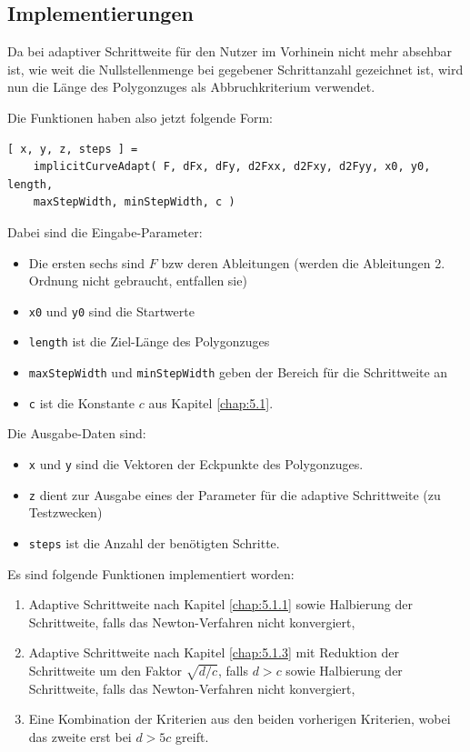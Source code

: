 \documentclass[a4paper,11pt,bibliography=totoc,listof=totoc,headinclude=true,cleardoublepage=empty,oneside]{scrartcl}
\begin{document}
\subsection{Implementierungen}
Da bei adaptiver Schrittweite für den Nutzer im Vorhinein nicht mehr absehbar ist, wie weit die Nullstellenmenge bei gegebener Schrittanzahl gezeichnet ist, wird nun die Länge des Polygonzuges als Abbruchkriterium verwendet.

Die Funktionen haben also jetzt folgende Form:
\begin{verbatim}
[ x, y, z, steps ] = 
    implicitCurveAdapt( F, dFx, dFy, d2Fxx, d2Fxy, d2Fyy, x0, y0, length,
    maxStepWidth, minStepWidth, c )
\end{verbatim}
Dabei sind die Eingabe-Parameter:
\begin{itemize}
	\item Die ersten sechs sind $F$ bzw deren Ableitungen (werden die Ableitungen 2. Ordnung nicht gebraucht, entfallen sie)
	\item \verb|x0| und \verb|y0| sind die Startwerte
	\item \verb|length| ist die Ziel-Länge des Polygonzuges
	\item \verb|maxStepWidth| und \verb|minStepWidth| geben der Bereich für die Schrittweite an
	\item \verb|c| ist die Konstante $c$ aus Kapitel \ref{chap:5.1}.
\end{itemize}

Die Ausgabe-Daten sind:
\begin{itemize}
	\item \verb|x| und \verb|y| sind die Vektoren der Eckpunkte des Polygonzuges.
	\item \verb|z| dient zur Ausgabe eines der Parameter für die adaptive Schrittweite (zu Testzwecken)
	\item \verb|steps| ist die Anzahl der benötigten Schritte.
\end{itemize}

Es sind folgende Funktionen implementiert worden:
\begin{enumerate}
	\item Adaptive Schrittweite nach Kapitel \ref{chap:5.1.1} sowie Halbierung der Schrittweite, falls das Newton-Verfahren nicht konvergiert,
	\item Adaptive Schrittweite nach Kapitel \ref{chap:5.1.3} mit Reduktion der Schrittweite um den Faktor $\sqrt{d/c}$, falls $d>c$ sowie Halbierung der Schrittweite, falls das Newton-Verfahren nicht konvergiert,
	\item Eine Kombination der Kriterien aus den beiden vorherigen Kriterien, wobei das zweite erst bei $d>5c$ greift.
\end{enumerate}
\end{document}
